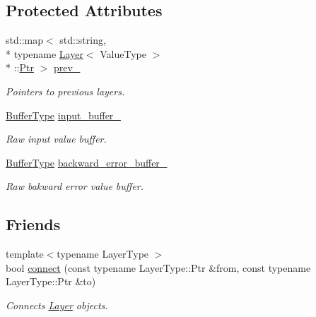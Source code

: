 \subsection*{Protected Attributes}
\begin{DoxyCompactItemize}
\item 
std\-::map$<$ std\-::string, \\*
typename \hyperlink{classffnn_1_1layer_1_1_layer}{Layer}$<$ Value\-Type $>$\\*
\-::\hyperlink{classffnn_1_1layer_1_1_layer_ab909b3fbacb9688059f9f22302f266f4}{Ptr} $>$ \hyperlink{classffnn_1_1layer_1_1_layer_ab1546472cf5b9c87aed6f75852e123c7}{prev\-\_\-}
\begin{DoxyCompactList}\small\item\em Pointers to previous layers. \end{DoxyCompactList}\item 
\hyperlink{classffnn_1_1layer_1_1_layer_a3f2e9c375d9bcf80e6000e9e53ba212d}{Buffer\-Type} \hyperlink{classffnn_1_1layer_1_1_layer_ad4b5ac0708d6ada04d62df4fad377f1a}{input\-\_\-buffer\-\_\-}
\begin{DoxyCompactList}\small\item\em Raw input value buffer. \end{DoxyCompactList}\item 
\hyperlink{classffnn_1_1layer_1_1_layer_a3f2e9c375d9bcf80e6000e9e53ba212d}{Buffer\-Type} \hyperlink{classffnn_1_1layer_1_1_layer_a79d676e9b8bd04d1a438266206d4b321}{backward\-\_\-error\-\_\-buffer\-\_\-}
\begin{DoxyCompactList}\small\item\em Raw bakward error value buffer. \end{DoxyCompactList}\end{DoxyCompactItemize}
\subsection*{Friends}
\begin{DoxyCompactItemize}
\item 
{\footnotesize template$<$typename Layer\-Type $>$ }\\bool \hyperlink{classffnn_1_1layer_1_1_layer_afbf91ff52dc8c3e894968dcc27cdecd5}{connect} (const typename Layer\-Type\-::\-Ptr \&from, const typename Layer\-Type\-::\-Ptr \&to)
\begin{DoxyCompactList}\small\item\em Connects \hyperlink{classffnn_1_1layer_1_1_layer}{Layer} objects. \end{DoxyCompactList}\end{DoxyCompactItemize}


